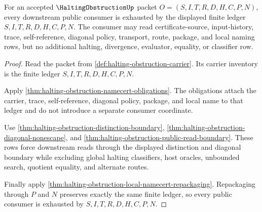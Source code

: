 \begin{theorem}
\label{thm:halting-obstruction-public-consumer-ledger-exhaustion}
For an accepted $\HaltingObstructionUp$ packet $O=(S,I,T,R,D,H,C,P,N)$, every downstream public consumer is exhausted by the displayed finite ledger $S,I,T,R,D,H,C,P,N$. The consumer may read certificate-source, input-history, trace, self-reference, diagonal policy, transport, route, package, and local naming rows, but no additional halting, divergence, evaluator, equality, or classifier row.
\end{theorem}
\begin{proof}
Read the packet from \autoref{def:halting-obstruction-carrier}. Its carrier inventory is the finite ledger $S,I,T,R,D,H,C,P,N$.

Apply \autoref{thm:halting-obstruction-namecert-obligations}. The obligations attach the carrier, trace, self-reference, diagonal policy, package, and local name to that ledger and do not introduce a separate consumer coordinate.

Use \autoref{thm:halting-obstruction-distinction-boundary}, \autoref{thm:halting-obstruction-diagonal-nonescape}, and \autoref{thm:halting-obstruction-public-read-boundary}. These rows force downstream reads through the displayed distinction and diagonal boundary while excluding global halting classifiers, host oracles, unbounded search, quotient equality, and alternate routes.

Finally apply \autoref{thm:halting-obstruction-local-namecert-repackaging}. Repackaging through $P$ and $N$ preserves exactly the same finite ledger, so every public consumer is exhausted by $S,I,T,R,D,H,C,P,N$.
\end{proof}

